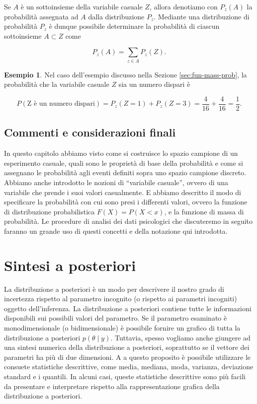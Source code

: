 \documentclass[
  11pt,
]{krantz}
\theoremstyle{definition}
\theoremstyle{definition}
\newtheorem{example}{Esempio}[chapter]
\theoremstyle{definition}
\theoremstyle{definition}
\theoremstyle{remark}
\begin{document}
Se \(A\) è un sottoinsieme della variabile casuale \(Z\), allora denotiamo con \(P_{z}(A)\) la probabilità assegnata ad \(A\) dalla distribuzione \(P_{z}\). Mediante una distribuzione di probabilità \(P_{z}\) è dunque possibile determinare la probabilità di ciascun sottoinsieme \(A \subset Z\) come

\[
P_{z}(A) = \sum_{z \in A} P_{z}(Z).
\]

\begin{example}
Nel caso dell'esempio discusso nella Sezione \ref{sec:fun-mass-prob}, la probabilità che la variabile casuale \(Z\) sia un numero dispari è

\[
P(\text{Z è un numero dispari}) = P_{z}(Z = 1) + P_{z}(Z = 3) = \frac{4}{16} + \frac{4}{16} = \frac{1}{2}.
\]
\end{example}

\hypertarget{commenti-e-considerazioni-finali}{%
\section*{Commenti e considerazioni finali}\label{commenti-e-considerazioni-finali}}


In questo capitolo abbiamo visto come si costruisce lo spazio campione di un esperimento casuale, quali sono le proprietà di base della probabilità e come si assegnano le probabilità agli eventi definiti sopra uno spazio campione discreto. Abbiamo anche introdotto le nozioni di ``variabile casuale'', ovvero di una variabile che prende i suoi valori casualmente. E abbiamo descritto il modo di specificare la probabilità con cui sono presi i differenti valori, ovvero la funzione di distribuzione probabilistica \(F(X) = P(X < x)\), e la funzione di massa di probabilità. Le procedure di analisi dei dati psicologici che discuteremo in seguito faranno un grande uso di questi concetti e della notazione qui introdotta.

\hypertarget{chapter-sintesi-distr-post}{%
\chapter{Sintesi a posteriori}\label{chapter-sintesi-distr-post}}

La distribuzione a posteriori è un modo per descrivere il nostro grado di incertezza rispetto al parametro incognito (o rispetto ai parametri incogniti) oggetto dell'inferenza. La distribuzione a posteriori contiene tutte le informazioni disponibili sui possibili valori del parametro. Se il parametro esaminato è monodimensionale (o bidimensionale) è possibile fornire un grafico di tutta la distribuzione a posteriori \(p(\theta \mid y)\). Tuttavia, spesso vogliamo anche giungere ad una sintesi numerica della distribuzione a posteriori, soprattutto se il vettore dei parametri ha più di due dimensioni. A a questo proposito è possibile utilizzare le consuete statistiche descrittive, come media, mediana, moda, varianza, deviazione standard e i quantili. In alcuni casi, queste statistiche descrittive sono più facili da presentare e interpretare rispetto alla rappresentazione grafica della distribuzione a posteriori.
\end{document}
